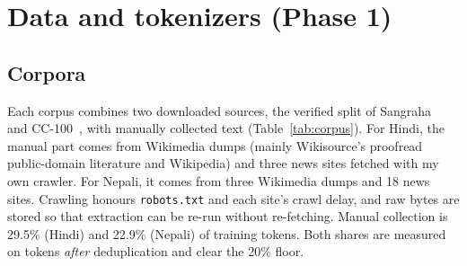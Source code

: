 \documentclass[10pt,a4paper]{article}
\newcommand{\code}[1]{\texttt{#1}}
\newcommand{\tablefile}[1]{}
\begin{document}
\section{Data and tokenizers (Phase 1)}
\subsection{Corpora}
Each corpus combines two downloaded sources, the verified split of Sangraha~\cite{sangraha} and CC-100~\cite{ccnet}, with manually collected text (Table~\ref{tab:corpus}).
For Hindi, the manual part comes from Wikimedia dumps (mainly Wikisource's proofread public-domain literature and Wikipedia) and three news sites fetched with my own crawler.
For Nepali, it comes from three Wikimedia dumps and 18 news sites.
Crawling honours \code{robots.txt} and each site's crawl delay, and raw bytes are stored so that extraction can be re-run without re-fetching.
Manual collection is 29.5\% (Hindi) and 22.9\% (Nepali) of training tokens. Both shares are measured on tokens \emph{after} deduplication and clear the 20\% floor.

\begin{table}[t]
\centering\small
\begin{minipage}[b]{0.66\linewidth}\centering
\tablefile{corpus}
\caption{Corpus statistics. Tokens are counted by encoding every document with the chosen 16k tokenizer.}
\label{tab:corpus}
\end{minipage}\\[6pt]
\begin{minipage}[b]{0.62\linewidth}\centering
\tablefile{tokenizer}
\caption{Tokenizer sweep on 2{,}000 held-out validation documents. Fertility is tokens per whitespace word; byte fallback is the share of tokens that are raw bytes. The unknown-token rate is zero at every size (see text).}
\label{tab:tokenizer}
\end{minipage}
\end{table}
\end{document}
